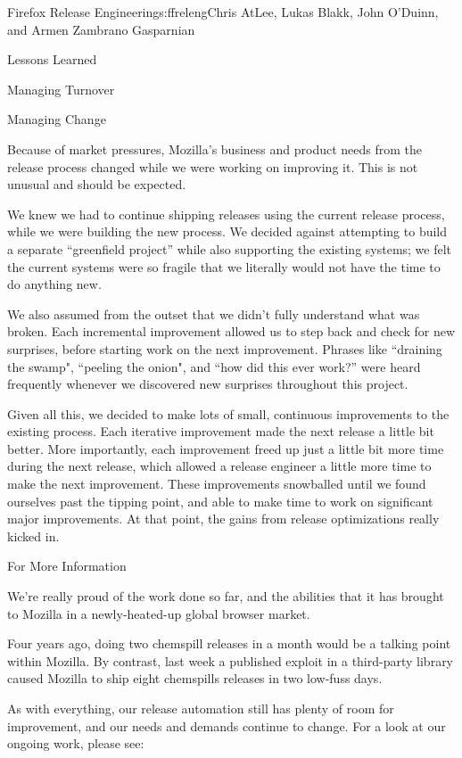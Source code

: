 \begin{aosachapter}{Firefox Release Engineering}{s:ffreleng}{Chris AtLee, Lukas Blakk, John O'Duinn, and Armen Zambrano Gasparnian}
\begin{aosasect1}{Lessons Learned}
\begin{aosasect2}{Managing Turnover}
\end{aosasect2}

\begin{aosasect2}{Managing Change}

Because of market pressures, Mozilla's business and product needs from the release process changed
while we were working on improving it. This is not unusual and should be
expected.

We knew we had to continue shipping releases using the current release process,
while we were building the new process. We decided against attempting to build
a separate ``greenfield project'' while also supporting the existing
systems; we felt the current systems were so fragile that we literally would
not have the time to do anything new.

We also assumed from the outset that we didn't fully understand what was broken. Each
incremental improvement allowed us to step back and check for new surprises,
before starting work on the next improvement. Phrases like ``draining the
swamp", ``peeling the onion", and ``how did this ever work?'' were heard
frequently whenever we discovered new surprises throughout this project.

Given all this, we decided to make lots of small, continuous improvements to
the existing process. Each iterative improvement made the next release a little
bit better. More importantly, each improvement freed up just a little bit more
time during the next release, which allowed a release engineer a little more
time to make the next improvement. These improvements snowballed until
we found ourselves past the tipping point, and able to make time to work on
significant major improvements. At that point, the gains from release
optimizations really kicked in.

\end{aosasect2}
\end{aosasect1}

\begin{aosasect1}{For More Information}

We're really proud of the work done so far, and the abilities that it has
brought to Mozilla in a newly-heated-up global browser market.

Four years ago, doing two chemspill releases in a month would be a talking
point within Mozilla. By contrast, last week a published exploit in a third-party
library caused Mozilla to ship eight chemspills releases in two low-fuss days.

As with everything, our release automation still has plenty of room for
improvement, and our needs and demands continue to change. For a look at our
ongoing work, please see:


\end{aosasect1}
\end{aosachapter}
